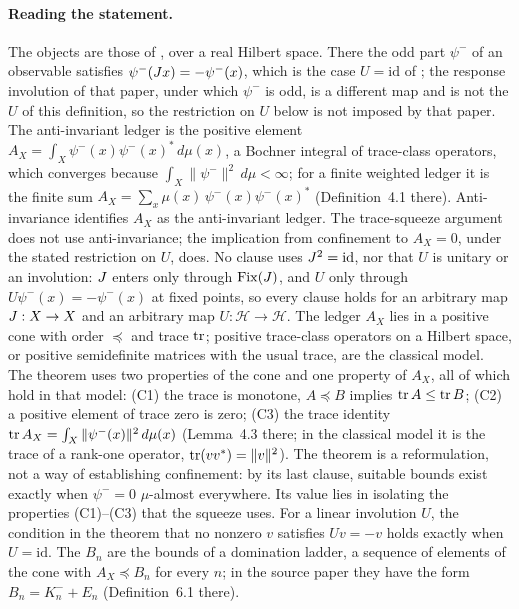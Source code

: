 \paragraph{Reading the statement.}
The objects are those of \citet{Tsiokos2026SDTC}, over a real Hilbert
space.  There the odd part \(\psi^-\) of an observable satisfies
\(\psi^-(J x)=-\psi^-(x)\), which is the case \(U=\mathrm{id}\) of
; the response involution of that paper,
under which \(\psi^-\) is odd, is a different map and is not the \(U\)
of this definition, so the restriction on \(U\) below is not imposed by
that paper. The anti-invariant ledger
is the positive element
\(A_X=\int_X\psi^-(x)\psi^-(x)^*\,d\mu(x)\), a Bochner integral of
trace-class operators, which converges because
\(\int_X\|\psi^-\|^2\,d\mu<\infty\); for a finite weighted ledger it is the
finite sum \(A_X=\sum_{x}\mu(x)\,\psi^-(x)\psi^-(x)^*\) (Definition~4.1
there). Anti-invariance identifies \(A_X\) as the anti-invariant ledger.
The trace-squeeze argument does not use anti-invariance; the implication from confinement to \(A_X=0\), under the stated restriction on \(U\), does. No clause uses \(J^2=\mathrm{id}\), nor that \(U\) is unitary or an involution: \(J\) enters only through \(\mathrm{Fix}(J)\), and \(U\) only through \(U\psi^-(x)=-\psi^-(x)\) at fixed points, so every clause holds for an arbitrary map \(J:X\to X\) and an arbitrary map \(U:\mathcal H\to\mathcal H\). The ledger \(A_X\) lies
in a positive cone with order \(\preceq\) and trace \(\operatorname{tr}\); positive
trace-class operators on a Hilbert space, or positive semidefinite matrices
with the usual trace, are the classical model. The theorem uses two
properties of the cone and one property of \(A_X\), all of which hold in that
model:
(C1) the trace is monotone, \(A\preceq B\) implies \(\operatorname{tr} A\le\operatorname{tr} B\);
(C2) a positive element of trace zero is zero;
(C3) the trace identity \(\operatorname{tr} A_X=\int_X\|\psi^-(x)\|^2\,d\mu(x)\)
(Lemma~4.3 there; in the classical model it is the trace of a rank-one
operator, \(\operatorname{tr}(vv^*)=\|v\|^2\)).
The theorem is a reformulation, not a way of establishing
confinement: by its last clause, suitable bounds exist exactly when
\(\psi^-=0\) \(\mu\)-almost everywhere.  Its value lies in isolating the
properties (C1)--(C3) that the squeeze uses.  For a linear involution
\(U\), the condition in the theorem that no nonzero \(v\) satisfies
\(Uv=-v\) holds exactly when \(U=\mathrm{id}\).
The \(B_n\) are the bounds of a domination ladder, a sequence of elements of
the cone with \(A_X\preceq B_n\) for every \(n\); in the source paper they
have the form \(B_n=K^-_n+E_n\) (Definition~6.1 there).

